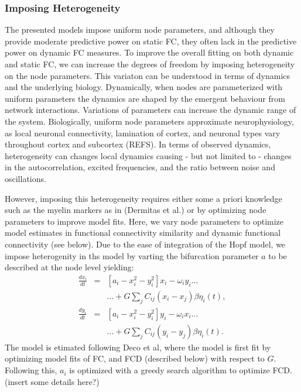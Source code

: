 \documentclass[oneside]{zHenriquesLab-StyleBioRxiv}
\begin{document}
\subsubsection*{Imposing Heterogeneity}
The presented models impose uniform node parameters, and although they provide moderate predictive power on static FC, they often lack in the predictive power on dynamic FC measures. To improve the overall fitting on both dynamic and static FC, we can increase the degrees of freedom by imposing heterogeneity on the node parameters. This variaton can be understood in terms of dynamics and the underlying biology. Dynamically, when nodes are parameterized with uniform parameters the dynamics are shaped by the emergent behaviour from network interactions. Variations of parameters can increase the dynamic range of the system. Biologically, uniform node parameters approximate neurophysiology, as local neuronal connectivity, lamination of cortex, and neuronal types vary throughout cortex and subcortex (REFS). In terms of observed dynamics, heterogeneity can changes local dynamics causing - but not limited to - changes in the autocorrelation, excited frequencies, and the ratio between noise and oscillations. 


However, imposing this heterogeneity requires either some a priori knowledge such as the myelin markers as in (Dermitas et al.) or by optimizing node parameters to improve model fits. Here, we vary node parameters to optimize model estimates in functional connectivity similarity and dynamic functional connectivity (see below). Due to the ease of integration of the Hopf model, we impose heterogenity in ths model by varting the bifurcation parameter $a$ to be described at the node level yielding:
\begin{eqnarray}
\frac{dx_i}{dt} &=& [a_i - x_i^2 - y_i^2]x_i- \omega_iy_i...\nonumber \\
& &...+ G\sum_jC_{ij}(x_i-x_j)\beta\eta_i(t), \label{eq:hopfHeteroNode1}\\
\frac{dy_i}{dt} &=& [a_i - x_i^2 - y_i^2]y_i - \omega_ix_i ... \nonumber\\
& &...+ G\sum_jC_{ij}(y_i-y_j)\beta\eta_i(t). \label{eq:hopfHeteroNode2}
\end{eqnarray}
The model is etimated following Deco et al, where the model is first fit by optimizing model fits of FC, and FCD (described below) with respect to $G$. Following this, $a_i$ is optimized with a greedy search algorithm to optimize FCD. (insert some details here?)
\end{document}
